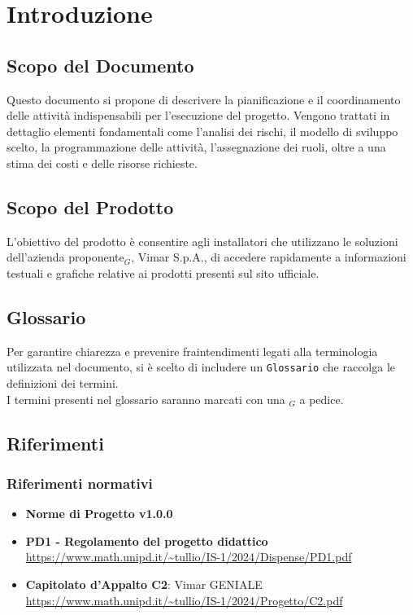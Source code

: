 \section{Introduzione}
\subsection{Scopo del Documento}
Questo documento si propone di descrivere la pianificazione e il coordinamento delle attività indispensabili per l'esecuzione del progetto. Vengono trattati in dettaglio elementi fondamentali come l'analisi dei rischi, il modello di sviluppo scelto, la programmazione delle attività, l'assegnazione dei ruoli, oltre a una stima dei costi e delle risorse richieste.
\subsection{Scopo del Prodotto} 
L'obiettivo del prodotto è consentire agli installatori che utilizzano le soluzioni dell'azienda proponente$_G$, Vimar S.p.A., di accedere rapidamente a informazioni testuali e grafiche relative ai prodotti presenti sul sito ufficiale.
\subsection{Glossario}
Per garantire chiarezza e prevenire fraintendimenti legati alla terminologia utilizzata nel documento, si è scelto di includere un \texttt{Glossario} che raccolga le definizioni dei termini.\\ I termini presenti nel glossario saranno marcati con una $_G$ a pedice.
\subsection{Riferimenti}
\subsubsection{Riferimenti  normativi}  
\begin{itemize}
    \item \textbf{Norme di Progetto v1.0.0}
    \item \textbf{PD1 - Regolamento del progetto didattico} \\
    \url{https://www.math.unipd.it/~tullio/IS-1/2024/Dispense/PD1.pdf} 
    \item \textbf{Capitolato d'Appalto C2}: Vimar GENIALE \\
    \url{https://www.math.unipd.it/~tullio/IS-1/2024/Progetto/C2.pdf}
\end{itemize}
